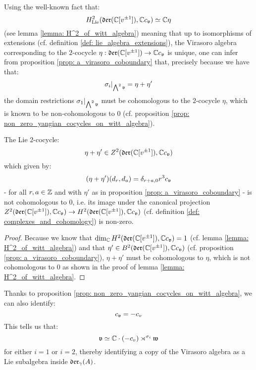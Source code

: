         Using the well-known fact that:
            $$H^2_{\mathrm{Lie}}(\mathfrak{der}(\mathbb{C}[v^{\pm 1}]), \mathbb{C} c_{\mathfrak{v}}) \simeq \mathbb{C} \eta$$
        (see lemma \ref{lemma: H^2_of_witt_algebra}) meaning that up to isomorphisms of extensions (cf. definition \ref{def: lie_algebra_extensions}), the Virasoro algebra corresponding to the $2$-cocycle $\eta: \mathfrak{der}(\mathbb{C}[v^{\pm 1}]) \to \mathbb{C} c_{\mathfrak{v}}$ is unique, one can infer from proposition \ref{prop: a_virasoro_coboundary} that, precisely because we have that:
            $$\sigma_i|_{ \bigwedge^2 \mathfrak{v} } = \eta + \eta'$$
        the domain restrictions $\sigma_1|_{ \bigwedge^2 \mathfrak{v} }$ must be cohomologous to the $2$-cocycle $\eta$, which is known to be non-cohomologous to $0$ (cf. proposition \ref{prop: non_zero_yangian_cocycles_on_witt_algebra}). 
        \begin{proposition} \label{prop: non_zero_yangian_cocycles_on_witt_algebra}
            The Lie $2$-cocycle:
                $$\eta + \eta' \in Z^2(\mathfrak{der}(\mathbb{C}[v^{\pm 1}]), \mathbb{C} c_{\mathfrak{v}})$$
            which given by:
                $$(\eta + \eta')(d_r, d_a) = \delta_{r + a, 0} r^3 c_{\mathfrak{v}}$$
            - for all $r, a \in \mathbb{Z}$ and with $\eta'$ as in proposition \ref{prop: a_virasoro_coboundary} - is not cohomologous to $0$, i.e. its image under the canonical projection $Z^2(\mathfrak{der}(\mathbb{C}[v^{\pm 1}]), \mathbb{C} c_{\mathfrak{v}}) \to H^2(\mathfrak{der}(\mathbb{C}[v^{\pm 1}]), \mathbb{C} c_{\mathfrak{v}})$ (cf. definition \ref{def: complexes_and_cohomology}) is non-zero.
        \end{proposition}
            \begin{proof}
                Because we know that $\dim_{\mathbb{C}} H^2(\mathfrak{der}(\mathbb{C}[v^{\pm 1}]), \mathbb{C} c_{\mathfrak{v}}) = 1$ (cf. lemma \ref{lemma: H^2_of_witt_algebra}) and that $\eta' \in B^2(\mathfrak{der}(\mathbb{C}[v^{\pm 1}]), \mathbb{C} c_{\mathfrak{v}})$ (cf. proposition \ref{prop: a_virasoro_coboundary}), $\eta + \eta'$ must be cohomologous to $\eta$, which is not cohomologous to $0$ as shown in the proof of lemma \ref{lemma: H^2_of_witt_algebra}.
            \end{proof}
        \begin{remark}
            Thanks to proposition \ref{prop: non_zero_yangian_cocycles_on_witt_algebra}, we can also identify:
                $$c_{\mathfrak{v}} = -c_v$$
            This tells us that:
                $$\mathfrak{v} \simeq \mathbb{C} \cdot (-c_v) \rtimes^{\sigma_i} \mathfrak{w}$$
            for either $i = 1$ or $i = 2$, thereby identifying a copy of the Virasoro algebra as a Lie subalgebra inside $\mathfrak{der}_{\gamma}(A)$.
        \end{remark}

